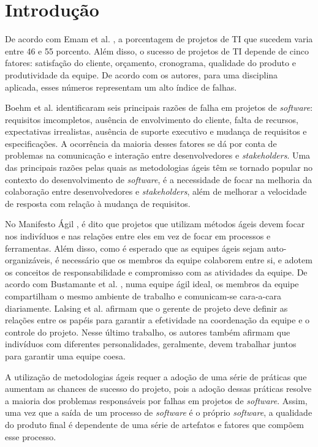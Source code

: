 \chapter{Introdução}
\label{introducao}

De acordo com Emam et al. \cite{emam}, a porcentagem de projetos de TI que sucedem varia entre 46 e 55 porcento. Além disso, o sucesso de projetos de TI depende de cinco fatores: satisfação do cliente, orçamento, cronograma, qualidade do produto e produtividade da equipe. De acordo com os autores, para uma disciplina aplicada, esses números representam um alto índice de falhas.

Boehm et al. \cite{boehm} identificaram seis principais razões de falha em projetos de \textit{software}: requisitos imcompletos, ausência de envolvimento do cliente, falta de recursos, expectativas irrealistas, ausência de suporte executivo e mudança de requisitos e especificações. A ocorrência da maioria desses fatores se dá por conta de problemas na comunicação e interação entre desenvolvedores e \textit{stakeholders}. Uma das principais razões pelas quais as metodologias ágeis têm se tornado popular no contexto do desenvolvimento de \textit{software}, é a necessidade de focar na melhoria da colaboração entre desenvolvedores e \textit{stakeholders}, além de melhorar a velocidade de resposta com relação à mudança de requisitos.

No Manifesto Ágil \cite{manifesto}, é dito que projetos que utilizam métodos ágeis devem focar nos indivíduos e nas relações entre eles em vez de focar em processos e ferramentas. Além disso, como é esperado que as equipes ágeis sejam auto-organizáveis, é necessário que os membros da equipe colaborem entre si, e adotem os conceitos de responsabilidade e compromisso com as atividades da equipe. De acordo com Bustamante et al. \cite{bustamante}, numa equipe ágil ideal, os membros da equipe compartilham o mesmo ambiente de trabalho e comunicam-se cara-a-cara diariamente. Lalsing et al. \cite{lalsing} afirmam que o gerente de projeto deve definir as relações entre os papéis para garantir a efetividade na coordenação da equipe e o controle do projeto. Nesse último trabalho, os autores também afirmam que indivíduos com diferentes personalidades, geralmente, devem trabalhar juntos para garantir uma equipe coesa.

A utilização de metodologias ágeis requer a adoção de uma série de práticas que aumentam as chances de sucesso do projeto, pois a adoção dessas práticas resolve a maioria dos problemas responsáveis por falhas em projetos de \textit{software}. Assim, uma vez que a saída de um processo de \textit{software} é o próprio \textit{software}, a qualidade do produto final é dependente de uma série de artefatos e fatores que compõem esse processo.

